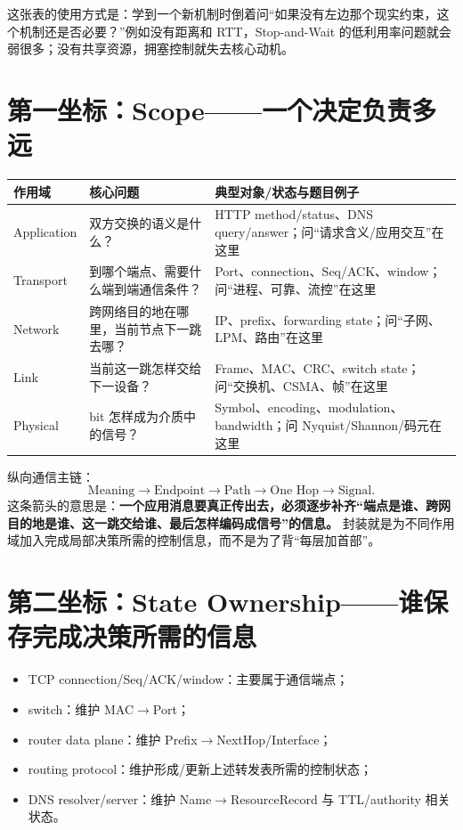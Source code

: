 \documentclass[11pt,a4paper,openany]{ctexbook}
\newcommand{\key}[1]{\textbf{\color{deep}#1}}
\begin{document}
这张表的使用方式是：学到一个新机制时倒着问“如果没有左边那个现实约束，这个机制还是否必要？”例如没有距离和 RTT，Stop-and-Wait 的低利用率问题就会弱很多；没有共享资源，拥塞控制就失去核心动机。

\section{第一坐标：Scope——一个决定负责多远}
\begin{longtable}{L{2.5cm}L{4.4cm}L{\dimexpr\linewidth-8.17cm\relax}}
\toprule
\textbf{作用域} & \textbf{核心问题} & \textbf{典型对象/状态与题目例子}\\
\midrule
Application & 双方交换的语义是什么？ & HTTP method/status、DNS query/answer；问“请求含义/应用交互”在这里 \\
Transport & 到哪个端点、需要什么端到端通信条件？ & Port、connection、Seq/ACK、window；问“进程、可靠、流控”在这里 \\
Network & 跨网络目的地在哪里，当前节点下一跳去哪？ & IP、prefix、forwarding state；问“子网、LPM、路由”在这里 \\
Link & 当前这一跳怎样交给下一设备？ & Frame、MAC、CRC、switch state；问“交换机、CSMA、帧”在这里 \\
Physical & bit 怎样成为介质中的信号？ & Symbol、encoding、modulation、bandwidth；问 Nyquist/Shannon/码元在这里 \\
\bottomrule
\end{longtable}

纵向通信主链：
\[
\boxed{\text{Meaning}\rightarrow\text{Endpoint}\rightarrow\text{Path}\rightarrow\text{One Hop}\rightarrow\text{Signal}}.
\]
这条箭头的意思是：\key{一个应用消息要真正传出去，必须逐步补齐“端点是谁、跨网目的地是谁、这一跳交给谁、最后怎样编码成信号”的信息。} 封装就是为不同作用域加入完成局部决策所需的控制信息，而不是为了背“每层加首部”。

\section{第二坐标：State Ownership——谁保存完成决策所需的信息}
\begin{itemize}
  \item TCP connection/Seq/ACK/window：主要属于通信端点；
  \item switch：维护 MAC$\to$Port；
  \item router data plane：维护 Prefix$\to$NextHop/Interface；
  \item routing protocol：维护形成/更新上述转发表所需的控制状态；
  \item DNS resolver/server：维护 Name$\to$ResourceRecord 与 TTL/authority 相关状态。
\end{itemize}
\end{document}
